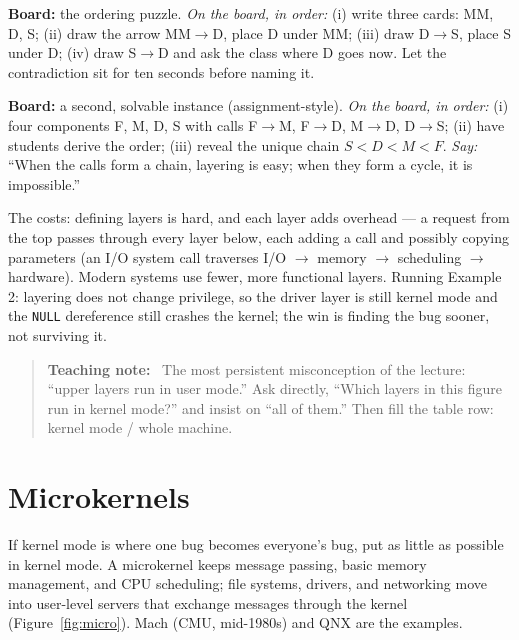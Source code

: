 \documentclass[11pt]{article}
\newenvironment{teachingaside}{\begin{quote}\small\color{primary-gold}\textbf{Teaching note:}\ }{\end{quote}}
\begin{document}
\textbf{Board:} the ordering puzzle. \emph{On the board, in order:} (i) write three cards: MM, D, S; (ii) draw the arrow MM$\to$D, place D under MM; (iii) draw D$\to$S, place S under D; (iv) draw S$\to$D and ask the class where D goes now. Let the contradiction sit for ten seconds before naming it.

\textbf{Board:} a second, solvable instance (assignment-style). \emph{On the board, in order:} (i) four components F, M, D, S with calls F$\to$M, F$\to$D, M$\to$D, D$\to$S; (ii) have students derive the order; (iii) reveal the unique chain $S < D < M < F$. \emph{Say:} ``When the calls form a chain, layering is easy; when they form a cycle, it is impossible.''

The costs: defining layers is hard, and each layer adds overhead --- a request from the top passes through every layer below, each adding a call and possibly copying parameters (an I/O system call traverses I/O $\to$ memory $\to$ scheduling $\to$ hardware). Modern systems use fewer, more functional layers. Running Example 2: layering does not change privilege, so the driver layer is still kernel mode and the \texttt{NULL} dereference still crashes the kernel; the win is finding the bug sooner, not surviving it.

\begin{teachingaside}
The most persistent misconception of the lecture: ``upper layers run in user mode.'' Ask directly, ``Which layers in this figure run in kernel mode?'' and insist on ``all of them.'' Then fill the table row: kernel mode / whole machine.
\end{teachingaside}

\section{Microkernels}

If kernel mode is where one bug becomes everyone's bug, put as little as possible in kernel mode. A microkernel keeps message passing, basic memory management, and CPU scheduling; file systems, drivers, and networking move into user-level servers that exchange messages through the kernel (Figure~\ref{fig:micro}). Mach (CMU, mid-1980s) and QNX are the examples.
\end{document}
